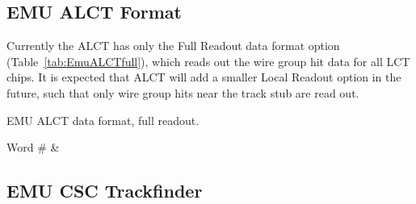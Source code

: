 \subsection{EMU ALCT Format}
Currently the ALCT has only the Full Readout data format option
(Table~\ref{tab:EmuALCTfull}), which reads out the wire group hit
data for all LCT chips.
It is expected that ALCT will
add a smaller Local Readout option in the future,
such that only wire group hits near the track stub are read out.
\begin{table}[tbp]
  \caption{EMU ALCT data format, full readout.}\label{tab:EmuALCTfull}
    \begin{TMBtabular}{16}
      Word \# & \bitNumTwoByte\hline

    \end{TMBtabular}
\end{table}


\subsection{EMU CSC Trackfinder}




